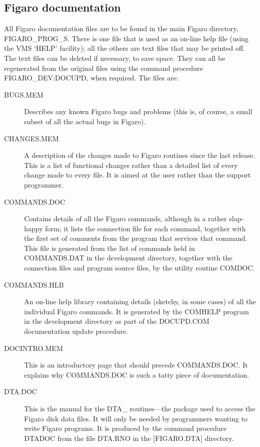 \subsection{Figaro documentation}

All Figaro documentation files are to be found in the main Figaro
directory, FIGARO\_PROG\_S. There is one file that is used as an on-line help
file (using the VMS `HELP' facility); all the others are text files that
may be printed off. The text files can be deleted if necessary, to save
space. They can all be regenerated from  the  original  files using
the  command  procedure FIGARO\_DEV:DOCUPD, when required. The files are:

\begin{description}

\item [BUGS.MEM] Describes any known Figaro bugs and problems (this is,
of course, a small subset of all the actual bugs in Figaro).

\item [CHANGES.MEM] A description of the changes made to Figaro routines
since the last release. This is a list of functional changes rather than a
detailed list of every change made to every file. It is aimed at the
user rather than  the  support programmer.

\item [COMMANDS.DOC] Contains details of all the Figaro commands, although
in a rather slap-happy form; it lists the connection file for each
command, together with the first set of comments from the program that
services that command. This file is generated from the list of commands
held in COMMANDS.DAT  in  the  development  directory, together with the
connection files and program source files, by the utility routine COMDOC.

\item [COMMANDS.HLB] An on-line help library containing details (sketchy,
in some cases) of all the individual Figaro commands. It is generated
by the COMHELP program in the development directory as part of the
DOCUPD.COM documentation update procedure.

\item [DOCINTRO.MEM] This is an introductory page that should precede
COMMANDS.DOC. It explains why COMMANDS.DOC is such a tatty piece of
documentation.

\item [DTA.DOC] This is the manual for the DTA\_ routines---the package
used to access the Figaro disk data files. It will only be needed by
programmers wanting to write Figaro programs. It is produced by the command
procedure DTADOC from the file DTA.RNO in the [FIGARO.DTA] directory.


\end{description}
